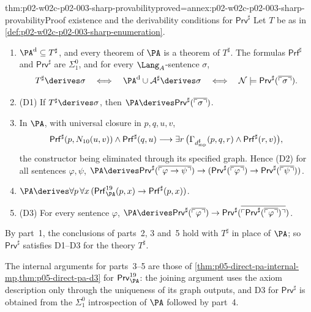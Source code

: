 \begin{hbtheorem}{thm:p02-w02c-p02-003-sharp-provability}{proved=annex:p02-w02c-p02-003-sharp-provability}{Proof existence and the derivability conditions for \(\mathsf{Prv}^{\sharp}\)}
Let \(T\) be as in \cref{def:p02-w02c-p02-003-sharp-enumeration}.
\begin{enumerate}
\item \(\PA^{\rm d}\subseteq T^{\sharp}\), and every theorem of \(\PA\)
      is a theorem of \(T^{\sharp}\).  The formulas \(\mathsf{Prf}^{\sharp}\)
      and \(\mathsf{Prv}^{\sharp}\) are \(\Sigma^0_1\), and for every
      \(\Lang_A\)-sentence \(\sigma\),
      \[
       T^{\sharp}\derives\sigma
       \quad\Longleftrightarrow\quad
       \PA^{\rm d}\cup\mathcal A^{\sharp}\derives\sigma
       \quad\Longleftrightarrow\quad
       \mathcal N\models\mathsf{Prv}^{\sharp}
                        (\overline{\ulcorner\sigma\urcorner}).
      \]
\item (D1) If \(T^{\sharp}\derives\sigma\), then
      \(\PA\derives\mathsf{Prv}^{\sharp}(\overline{\ulcorner\sigma\urcorner})\).
\item In \(\PA\), with universal closure in \(p,q,u,v\),
      \[
       \mathsf{Prf}^{\sharp}(p,N_{10}(u,v))\land\mathsf{Prf}^{\sharp}(q,u)
       \longrightarrow\exists r\,\bigl(\Gamma_{d^{\sharp}_{\rm mp}}(p,q,r)
       \land\mathsf{Prf}^{\sharp}(r,v)\bigr),
      \]
      the constructor being eliminated through its specified graph.
      Hence (D2) for all sentences \(\varphi,\psi\),
      \(\PA\derives\mathsf{Prv}^{\sharp}
      (\overline{\ulcorner\varphi\to\psi\urcorner})\to
      (\mathsf{Prv}^{\sharp}(\overline{\ulcorner\varphi\urcorner})\to
      \mathsf{Prv}^{\sharp}(\overline{\ulcorner\psi\urcorner}))\).
\item \(\PA\derives\forall p\,\forall x\,
      (\mathsf{Prf}^{19}_{\PA}(p,x)\to\mathsf{Prf}^{\sharp}(p,x))\).
\item (D3) For every sentence \(\varphi\),
      \(\PA\derives\mathsf{Prv}^{\sharp}(\overline{\ulcorner\varphi\urcorner})
      \to\mathsf{Prv}^{\sharp}(\overline{\ulcorner\mathsf{Prv}^{\sharp}
      (\overline{\ulcorner\varphi\urcorner})\urcorner})\).
\end{enumerate}
By part~1, the conclusions of parts~2, 3 and~5 hold with \(T^{\sharp}\) in
place of \(\PA\); so \(\mathsf{Prv}^{\sharp}\) satisfies D1--D3 for the
theory \(T^{\sharp}\).
\end{hbtheorem}

The internal arguments for parts~3--5 are those of
\cref{thm:p05-direct-pa-internal-mp,thm:p05-direct-pa-d3} for
\(\mathsf{Prv}^{19}_{\PA}\): the joining argument uses the axiom
description only through the uniqueness of its graph outputs, and D3 for
\(\mathsf{Prv}^{\sharp}\) is obtained from the \(\Sigma^0_1\) introspection
of \(\PA\) followed by part~4.

